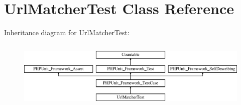 \section{Url\+Matcher\+Test Class Reference}
\label{class_symfony_1_1_component_1_1_routing_1_1_tests_1_1_matcher_1_1_url_matcher_test}
Inheritance diagram for Url\+Matcher\+Test\+:\begin{figure}[H]
\begin{center}
\leavevmode
\includegraphics[height=3.303835cm]{class_symfony_1_1_component_1_1_routing_1_1_tests_1_1_matcher_1_1_url_matcher_test}
\end{center}
\end{figure}

